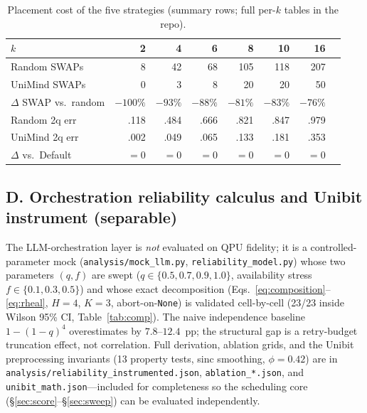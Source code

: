 \documentclass[journal,10pt,twocolumn]{IEEEtran}
\begin{document}
\begin{table}[h]
\caption{Placement cost of the five strategies (summary rows; full per-$k$ tables in the repo).}
\label{tab:routing2}
\centering
\footnotesize
\setlength{\tabcolsep}{3pt}
\begin{tabular}{@{}lrrrrrrr@{}}
\toprule
$k$ & 2 & 4 & 6 & 8 & 10 & 16\\
\midrule
Random SWAPs & 8 & 42 & 68 & 105 & 118 & 207\\
UniMind SWAPs & 0 & 3 & 8 & 20 & 20 & 50\\
$\Delta$ SWAP vs.\ random & $-100\%$ & $-93\%$ & $-88\%$ & $-81\%$ & $-83\%$ & $-76\%$\\
Random 2q err & .118 & .484 & .666 & .821 & .847 & .979\\
UniMind 2q err & .002 & .049 & .065 & .133 & .181 & .353\\
$\Delta$ vs.\ Default & $=0$ & $=0$ & $=0$ & $=0$ & $=0$ & $=0$\\
\bottomrule
\end{tabular}
\end{table}

\subsection*{D. Orchestration reliability calculus and Unibit instrument (separable)}
\label{app:orchestrator}
The LLM-orchestration layer is \emph{not} evaluated on QPU fidelity; it is a controlled-parameter
mock (\texttt{analysis/mock\_llm.py}, \texttt{reliability\_model.py}) whose two parameters $(q,f)$
are swept ($q\in\{0.5,0.7,0.9,1.0\}$, availability stress $f\in\{0.1,0.3,0.5\}$) and whose
exact decomposition (Eqs.~\ref{eq:composition}--\ref{eq:rheal}, $H{=}4$, $K{=}3$, abort-on-\texttt{None})
is validated cell-by-cell (23/23 inside Wilson 95\% CI, Table~\ref{tab:comp}). The naive independence
baseline $1-(1-q)^4$ overestimates by $7.8$--$12.4$~pp; the structural gap is a retry-budget truncation
effect, not correlation. Full derivation, ablation grids, and the Unibit preprocessing invariants
(13 property tests, sinc smoothing, $\phi{=}0.42$) are in \texttt{analysis/reliability\_instrumented.json},
\texttt{ablation\_*.json}, and \texttt{unibit\_math.json}---included for completeness so the scheduling
core (\S\ref{sec:score}--\S\ref{sec:sweep}) can be evaluated independently.
\end{document}
